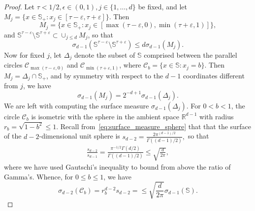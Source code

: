\documentclass[10pt,a4paper]{amsart}
\newcommand{\rset}{\mathbb{R}}
\newcommand{\sphere}{\mathbb{S}}
\begin{document}
    \begin{proof}
      Let $\tau<1/2,\epsilon\in(0,1), j\in\{1,\ldots, d\}$ be fixed, and let 
      $M_j = \{x \in \sphere_+: x_j\in
      [\tau-\varepsilon ,\tau+\varepsilon ]\}$. Then
      $$
      M_j = \{x \in \sphere_+: x_j\in
      [\max(\tau-\varepsilon,0) ,\min(\tau+\varepsilon,1) ]\}, 
      $$
      and 
      $\sphere^{\tau-\varepsilon }\setminus\sphere^{\tau+\varepsilon }\subset
      \cup_{j\le d} M_j$,  so that
      \begin{equation}
          \label{eq:bound_union_slices1}
          \sigma_{d-1}(\sphere^{\tau-\varepsilon }\setminus\sphere^{\tau+\varepsilon })
      \le d\sigma_{d-1}(M_j).
      \end{equation} 
      Now for fixed $j$, %
      let $\Delta_j$ denote the subset of $\sphere$ comprised between the parallel circles
      $\mathcal{C}_{\max(\tau-\varepsilon,0) }$ and $\mathcal{C}_{\min(\tau+\varepsilon, 1) }$, where $\mathcal{C}_b = \{x\in\sphere: x_j = b\}$. Then $M_j = \Delta_j\cap\sphere_+$, and by symmetry with respect to the $d-1$ coordinates different from $j$, we have 
      \begin{equation}
          \label{eq:bound_union_slices_2}
          \sigma_{d-1}(M_j) = 2^{-d+1}\sigma_{d-1}(\Delta_j).
      \end{equation} 
      We are left with computing the surface measure $\sigma_{d-1}(\Delta_j)$. 
      For $0<b<1$, the circle $\mathcal{C}_b$ is isometric with the sphere in the ambient space $\rset^{d-1}$ with radius $r_b = \sqrt{1-b^2}\le 1$. %
Recall from~\eqref{eq:surface_measure_sphere} that       that the surface of the $d-2$-dimensional unit sphere is 
       $s_{d-2} = \frac{2 \pi^{(d-1)/2}}{\Gamma((d-1)/2)},  $
so that %
      \begin{align*}
        \frac{s_{d-2}}{s_{d-1}}  = \frac{\pi^{-1/2} \Gamma(d/2)}{\Gamma((d-1)/2)}
        \le \sqrt{\frac{d}{2\pi}}, 
      \end{align*}
      where we have used Gautschi's inequality to bound from above the ratio of Gamma's. 
      Whence, for $0\le b\le 1$, we have
$$
\sigma_{d-2}(\mathcal{C}_b) = r_b^{d-2} s_{d-2} = 
\le \sqrt{\frac{d}{2\pi}} \sigma_{d-1}(\sphere).%
$$
     

\end{proof}
\end{document}
